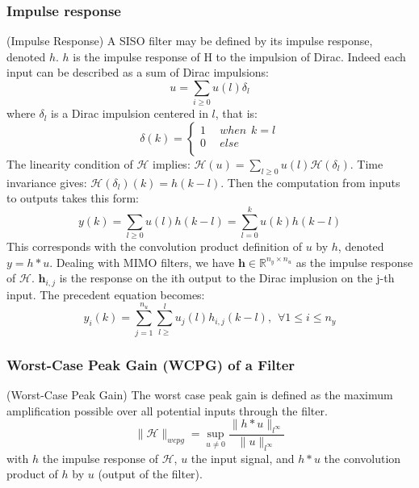 	\subsubsection{Impulse response}
	\begin{thdef} (Impulse Response)
	A SISO filter may be defined by its impulse response, denoted $h$. $h$ is the
	impulse response of H to the impulsion of Dirac.
	Indeed each input can be described as a sum of Dirac impulsions:
	$$u=\sum_{i\geq0}u(l)\delta_l$$
	where $\delta_l$ is a Dirac impulsion centered in $l$, that is:
	\begin{equation}
		\delta(k) =
		\begin{cases}
			1 & \hspace{5pt} when \hspace{5pt} k=l\\
			0 & \hspace{5pt} else\\
		\end{cases}
	\end{equation}
	The linearity condition of $\mathcal{H}$ implies: $\mathcal{H}(u) = \sum_{l\geq0}u(l)\mathcal{H}(\delta_l)$.
	Time invariance gives: $\mathcal{H}(\delta_l)(k)=h(k-l)$.
	Then the computation from inputs to outputs takes this form:
	$$y(k)=\sum_{l\geq0}u(l)h(k-l)=\sum_{l=0}^ku(k)h(k-l)$$
	This corresponds with the convolution product definition of $u$ by $h$, denoted $y = h * u$.
	Dealing with MIMO filters, we have $\boldsymbol{h} \in \mathbb{R}^{n_y \times n_u}$ as the impulse response of $\mathcal{H}$. $\boldsymbol{h}_{i,j}$ is the response on the
	ith output to the Dirac implusion on the j-th input.
	The precedent equation becomes:
	$$y_i(k)=\sum_{j=1}^{n_u}\sum_{l\geq}^lu_j(l)h_{i,j}(k-l), \hspace{5pt} \forall 1 \leq i \leq n_y$$
	
	\end{thdef} 

	\subsubsection{Worst-Case Peak Gain (WCPG) of a Filter}
	\begin{thdef} (Worst-Case Peak Gain)
		The worst case peak gain is defined as the maximum amplification
		possible over all potential inputs through the filter.
		$$\|\mathcal{H}\|_{wcpg}=\sup_{u\neq0}\frac{\|h*u\|_{l^{\infty}}}{\|u\|_{l^{\infty}}}$$
		with $h$ the impulse response of $\mathcal{H}$, $u$ the input signal, and $h * u$ the convolution product of $h$ by $u$ (output of the
				filter).
	
	\end{thdef}


